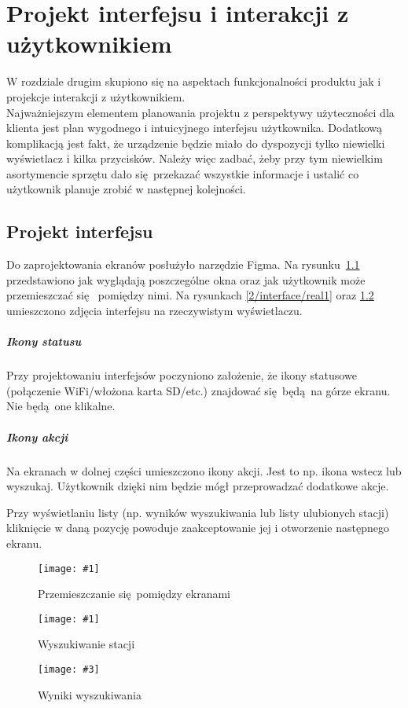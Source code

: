 \documentclass[12pt]{report}
\newcommand{\imgint}[4]{
	\begin{figure}[{#4}]
		\centering
		\texttt{[image: \#1]}
		\caption{#2}
		\label{#1}
	\end{figure}
}
\newcommand{\imgcs}[3]{\imgint{#1}{#2}{#3}{}}
\newcommand{\imgintss}[5]{
	\begin{figure}[{#5}]
		\centering
		\begin{minipage}{.45\textwidth}
			\centering
			\texttt{[image: \#1]}
			\caption{#2}
			\label{#1}
		\end{minipage}%
		\hfill
		\begin{minipage}{.45\textwidth}
			\centering
			\texttt{[image: \#3]}
			\caption{#4}
			\label{#3}
		\end{minipage}
	\end{figure}
}
\newcommand{\imgss}[4]{\imgintss{#1}{#2}{#3}{#4}{}}
\begin{document}
\chapter{Projekt interfejsu i interakcji z użytkownikiem}
	W rozdziale drugim skupiono się na aspektach funkcjonalności produktu jak i projekcje interakcji z użytkownikiem.\\
	
	Najważniejszym elementem planowania projektu z perspektywy użyteczności dla klienta jest plan wygodnego i intuicyjnego interfejsu użytkownika. Dodatkową komplikacją jest fakt, że urządzenie będzie miało do dyspozycji tylko niewielki wyświetlacz i kilka przycisków. Należy więc zadbać, żeby przy tym niewielkim asortymencie sprzętu dało się przekazać wszystkie informacje i ustalić co użytkownik planuje zrobić w następnej kolejności.
		
	\section{Projekt interfejsu}
		Do zaprojektowania ekranów posłużyło narzędzie Figma\textsuperscript{\cite{figma}}. Na rysunku~\ref{2/interface/all} przedstawiono jak wyglądają poszczególne okna oraz jak użytkownik może przemieszczać się  pomiędzy nimi. Na rysunkach \ref{2/interface/real1} oraz \ref{2/interface/real2} umieszczono zdjęcia interfejsu na rzeczywistym wyświetlaczu.
		
		\paragraph{Ikony statusu}
			Przy projektowaniu interfejsów poczyniono założenie, że ikony statusowe (połączenie WiFi/włożona karta SD/etc.) znajdować się będą na górze ekranu. Nie będą one klikalne.
			
		\paragraph{Ikony akcji}
			Na ekranach w dolnej części umieszczono ikony akcji. Jest to np. ikona wstecz lub wyszukaj. Użytkownik dzięki nim będzie mógł przeprowadzać dodatkowe akcje.
		
		$ $\\
		Przy wyświetlaniu listy (np. wyników wyszukiwania lub listy ulubionych stacji) kliknięcie w daną pozycję powoduje zaakceptowanie jej i otworzenie następnego ekranu.
	
		\imgcs{2/interface/all}{Przemieszczanie się pomiędzy ekranami}{0.9}
		\imgss{2/interface/real1}{Wyszukiwanie stacji}{2/interface/real2}{Wyniki wyszukiwania}
	
\end{document}
